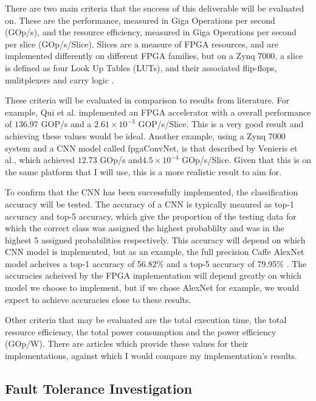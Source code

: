 \documentclass[12pt]{article}
\begin{document}
There are two main criteria that the success of this deliverable will be evaluated on. These are the performance, measured in Giga Operations per second (GOp/s), and the resource efficiency, measured in Giga Operations per second per slice (GOp/s/Slice). Slices are a measure of FPGA resources, and are implemented differently on different FPGA families, but on a Zynq 7000, a slice is defined as four Look Up Tables (LUTs), and their associated flip-flops, mulitplexers and carry logic \cite{ManualZynq}. 

These criteria will be evaluated in comparison to results from literature. For example, Qui et al. implemented an FPGA accelerator with a overall performance of $136.97$ GOP/s and a $2.61\times 10^{-3}$ GOP/s/Slice. This is a very good result and achieving these values would be ideal. Another example, using a Zynq 7000 system and a CNN model called fpgaConvNet, is that described by Venieris et al., which achieved $12.73$ GOp/s and$4.5\times 10^{-4}$ GOp/s/Slice\cite{fpgaConvNet}. Given that this is on the same platform that I will use, this is a more realistic result to aim for. 

To confirm that the CNN has been successfully implemented, the classification accuracy will be tested. The accuracy of a CNN is typically meaured as top-1 accuracy and top-5 accuracy, which give the proportion of the testing data for which the correct class was assigned the highest probablilty and was in the highest 5 assigned probabilities respectively. This accuracy will depend on which CNN model is implemented, but as an example, the full precision Caffe AlexNet model acheives a top-1 accuracy of 56.82\% and a top-5 accuracy of 79.95\% \cite{fpgaCnnAccelerator}. The accuracies acheived by the FPGA implementation will depend greatly on which model we choose to implement, but if we chose AlexNet for example, we would expect to achieve accuracies close to these results.

Other criteria that may be evaluated are the total execution time, the total resource efficiency, the total power consumption and the power efficiency (GOp/W). There are articles which provide these values for their implementations\cite{ChenFpgaAccelerator}, against which I would compare my implementation's results.

\subsection{Fault Tolerance Investigation}
\label{sec:EvalPlan-FaultTolInv}
\vspace{-12pt}
\end{document}

